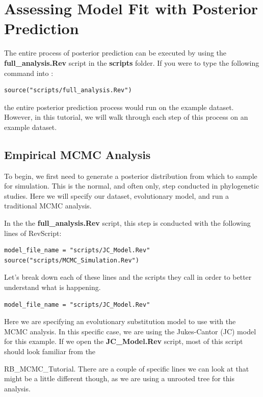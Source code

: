 \bigskip
\section{Assessing Model Fit with Posterior Prediction}

The entire process of posterior prediction can be executed by using the \textbf{full\_analysis.Rev} script in the \textbf{scripts}
folder. If you were to type the following command into \RevBayes:

{\tt \begin{snugshade*}
\begin{lstlisting}
source("scripts/full_analysis.Rev")
\end{lstlisting}
\end{snugshade*}}

the entire posterior prediction process would run on the example dataset. However, in this tutorial, we 
will walk through each step of this process on an example dataset. 

\subsection{Empirical MCMC Analysis}

To begin, we first need to generate a posterior distribution from which to sample for simulation. 
This is the normal, and often only, step conducted in phylogenetic studies. Here we will specify our 
dataset, evolutionary model, and run a traditional MCMC analysis. 

In the the \textbf{full\_analysis.Rev} script, this step is conducted with the following lines of RevScript:

{\tt \begin{snugshade*}
\begin{lstlisting}
model_file_name = "scripts/JC_Model.Rev"
source("scripts/MCMC_Simulation.Rev")
\end{lstlisting}
\end{snugshade*}}

Let's break down each of these lines and the scripts they call in order to better understand what is 
happening. 

{\tt \begin{snugshade*}
\begin{lstlisting}
model_file_name = "scripts/JC_Model.Rev" 
\end{lstlisting}
\end{snugshade*}}

Here we are specifying an evolutionary substitution model to use with the MCMC analysis. In this specific
case, we are using the Jukes-Cantor (JC) model for this example. If we open the \textbf{JC\_Model.Rev} 
script, most of this script should look familiar from the \item RB\_MCMC\_Tutorial. There are a couple of specific 
lines we can look at that might be a little different though, as we are using a unrooted tree for this
analysis. 

